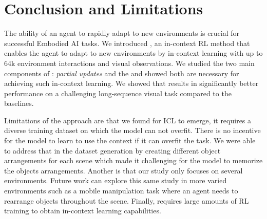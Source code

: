 \vspace{-10pt}
\section{Conclusion and Limitations}
  \vspace{-10pt}

 The ability of an agent to rapidly adapt to new environments is crucial for successful Embodied AI tasks. We introduced \method, an in-context RL method that enables the agent to adapt to new environments by in-context learning with up to 64k environment interactions and visual observations. We studied the two main components of \method: \textit{partial updates} and the \textit{\sinkv} and showed both are necessary for achieving such in-context learning. 
We showed that \method results in significantly better performance on a challenging long-sequence visual task compared to the baselines.

Limitations of the approach are that we found for ICL to emerge, it requires a diverse training dataset on which the model can not overfit. There is no incentive for the model to learn to use the context if it can overfit the task. We were able to address that in the dataset generation by creating different object arrangements for each scene which made it challenging for the model to memorize the objects arrangements.
Another is that our study only focuses on several environments.
Future work can explore this same study in more varied environments such as a mobile manipulation task where an agent needs to rearrange objects throughout the scene.
Finally, \method requires large amounts of RL training to obtain in-context learning capabilities. 


